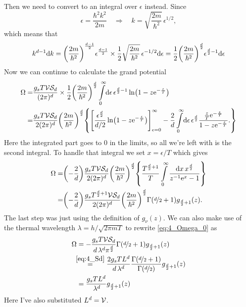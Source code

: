 \documentclass[11pt,letter, swedish, english
]{article}
\begin{document}
Then we need to convert to an integral over $\epsilon$ instead. Since 
\begin{equation}
\epsilon=\frac{\hbar^2k^2}{2m} 
\quad\Longrightarrow\quad
k=\sqrt{\frac{2m}{\hbar^2}} \,\epsilon^{1/2},
\end{equation}
which means that
\begin{equation}\label{eq:5_k->eps}
k^{d-1}\mathrm{d}{k}=\qty(\frac{2m}{\hbar^2})^{\frac{d-1}{2}}\epsilon^{\frac{d-1}{2}}
\times\frac{1}{2}\sqrt{\frac{2m}{\hbar^2}}
\,\epsilon^{-1/2}\mathrm{d}\epsilon
=\frac{1}{2}\qty(\frac{2m}{\hbar^2})^{\frac{d}{2}}
\epsilon^{\frac{d}{2}-1}\mathrm{d}\epsilon
\end{equation}
Now we can continue to calculate the grand potential
\begin{equation}
\begin{aligned}
\Omega =& \frac{g_sT\V\Sd}{(2\pi)^d}
\times\frac{1}{2}\qty(\frac{2m}{\hbar^2})^{\D{2}}
\int_0^\infty\!\rd\epsilon\, 
\epsilon^{\D{2}-1} \ln(1-z\ee^{-\frac{\epsilon}{T}})\\
=&\frac{g_sT\V\Sd}{2(2\pi)^d}
\qty(\frac{2m}{\hbar^2})^{\D{2}} \qty{
\qty[\frac{\epsilon^{\D{2}}}{d/2}
\ln(1-z\ee^{-\frac{\epsilon}{T}})]_{\epsilon=0}^\infty
-\frac{2}{d}\int_0^\infty\!\rd\epsilon\, 
\epsilon^{\D{2}}\frac{\frac{z}{T}\ee^{-\frac{\epsilon}{T}}}
{1-z\ee^{-\frac{\epsilon}{T}}}.
}\\
\end{aligned}
\end{equation}
Here the integrated part goes to $0$ in the limits, so all we're left
with is the second integral. To handle that integral we set
$x=\epsilon/T$ which gives
\begin{equation}\label{eq:4_Omega_0}
\begin{aligned}
\Omega =&\qty(-\frac{2}{d})\frac{g_sT\V\Sd}{2(2\pi)^d}
\qty(\frac{2m}{\hbar^2})^{\D{2}} \qty{
\frac{T^{\D{2}+1}}{T}\int_0^\infty
\frac{\rd{x}\, x^{\D{2}}}{z^{-1}\ee^{x}-1}
}\\
=&\qty(-\frac{2}{d})\frac{g_sT^{\D{2}+1}\V\Sd}{2(2\pi)^d}
\qty(\frac{2m}{\hbar^2})^{\D{2}} \Gamma\qty(\nD{2}+1)g_{\D{2}+1}(z).
\end{aligned}
\end{equation}
The last step was just using the definition of $g_\nu(z)$. We can also
make use of the thermal wavelength $\lambda=h/\sqrt{2\pi mT}$ to
rewrite \eqref{eq:4_Omega_0} as 
\begin{equation}\label{eq:4_Omega}
\begin{aligned}
\Omega &=-\frac{g_sT\mathcal{V}\mathcal{S}_d}{d\,\lambda^d \pi^{\frac{d}{2}}}
\Gamma\qty(\nicefrac{d}{2}+1)g_{\frac{d}{2}+1}(z)\\
&\hspace{-4pt}\stackrel{\eqref{eq:4_Sd}}{=}
\frac{2g_sTL^d}{d\,\lambda^d}
\frac{\Gamma(\nicefrac{d}{2}+1)}{\Gamma(\nicefrac{d}{2})}g_{\frac{d}{2}+1}(z)\\
&=\frac{g_sTL^d}{\,\lambda^d}g_{\frac{d}{2}+1}(z)
\end{aligned}
\end{equation}
Here I've also substituted $L^d=\mathcal{V}$.
\end{document}

